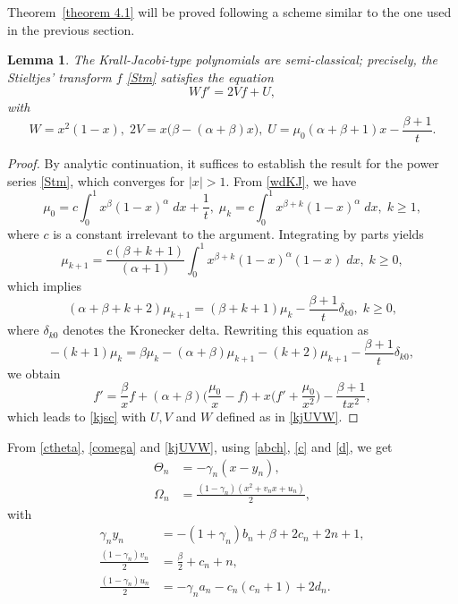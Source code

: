 \documentclass[10pt, reqno]{amsart}
\numberwithin{equation}{section}
\newtheorem{lemma}{Lemma}[section]
\numberwithin{equation}{section}
\begin{document}
Theorem~\ref{theorem 4.1} will be proved following a scheme similar to the one used in the previous section. 
\begin{lemma} \label{lemma 4.1}
The Krall-Jacobi-type polynomials are semi-classical; precisely, the Stieltjes' transform $f$ \eqref{Stm} satisfies the equation 
\begin{equation} 
Wf'=2Vf+U,\label{kjsc}
\end{equation}
with
\begin{equation}
W=x^2(1-x),\; 2V=x\big(\beta-(\alpha+\beta)x\big),\;
U=\mu_0(\alpha+\beta+1)x-\frac{\beta+1}{t}.\label{kjUVW}
\end{equation}
\end{lemma}
\begin{proof}
By analytic continuation, it suffices to establish the result for the power series \eqref{Stm}, which converges for $\vert x\vert >1$.  From \eqref{wdKJ}, we have
\begin{equation*}
\mu_0=c\int_0^1 x^\beta (1-x)^{\alpha}\;dx+\frac{1}{t},\;\mu_k=c\int_0^1 x^{\beta+k}(1-x)^\alpha\;dx,\; k\geq 1,
\end{equation*}
where $c$ is a constant irrelevant to the argument. Integrating by parts yields
\begin{equation*}
\mu_{k+1}=\frac{c(\beta+k+1)}{(\alpha+1)} \int_0^1x^{\beta+k}(1-x)^{\alpha}(1-x)\;dx,\; k\geq 0, 
\end{equation*}
which implies 
\begin{equation*}
(\alpha+\beta+k+2)\mu_{k+1}=(\beta+k+1)\mu_k-\frac{\beta+1}{t}\delta_{k0}, \;k\geq 0,
\end{equation*}
where $\delta_{k0}$ denotes the Kronecker delta. Rewriting this equation as 
\begin{equation*}
-(k+1)\mu_k=\beta\mu_k-(\alpha+\beta)\mu_{k+1}-(k+2)\mu_{k+1}-\frac{\beta+1}{t}\delta_{k0},
\end{equation*}
we obtain
\begin{equation*}
f'=\frac{\beta}{x}f+(\alpha+\beta)\Big(\frac{\mu_0}{x}-f\Big)+x\Big(f'+\frac{\mu_0}{x^2}\Big)-\frac{\beta+1}{tx^2},
\end{equation*}
which leads to \eqref{kjsc} with $U,V$ and $W$ defined as in \eqref{kjUVW}.
\end{proof}

From \eqref{ctheta}, \eqref{comega} and \eqref{kjUVW}, using \eqref{abch}, \eqref{c} and \eqref{d}, we get
\begin{align}
\Theta_n&=-\gamma_n(x-y_n),\label{KJtheta}\\
\Omega_n&=\frac{(1-\gamma_n)(x^2+v_nx+u_n)}{2}\label{KJomega},
\end{align}
with 
\begin{align}
\gamma_ny_n&=-(1+\gamma_n)b_n+\beta+2c_n+2n+1,\label{ybc}\\
\frac{(1-\gamma_n)v_n}{2}&=\frac{\beta}{2}+c_n+n,\label{vc}\\
\frac{(1-\gamma_n)u_n}{2}&=-\gamma_n a_n-c_n(c_n+1)+2d_n. \label{uacd}
\end{align}
\end{document}
